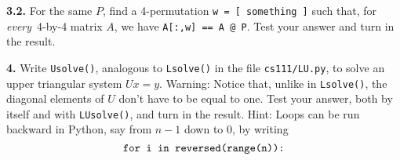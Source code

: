 \documentclass[11pt]{article}
\begin{document}
\par\medskip
{\bf 3.2.} For the same $P$, 
find a 4-permutation {\tt w = [ something ]}
such that, for {\em every}\, 4-by-4 matrix $A$, 
we have {\tt A[:,w] == A @ P}. 
Test your answer and turn in the result.

\par\bigskip
{\bf 4.}
Write {\tt Usolve()}, analogous to {\tt Lsolve()} in 
the file {\tt cs111/LU.py},
to solve an upper triangular system $Ux=y$. 
Warning: Notice that, unlike in {\tt Lsolve()}, 
the diagonal elements of $U$ don't have to be equal to one.
Test your answer, both by itself and with {\tt LUsolve()},
and turn in the result.
Hint: Loops can be run backward in Python, 
say from $n-1$ down to $0$, by writing
$$\mbox{\tt for i in reversed(range(n)):}$$
\end{document}
